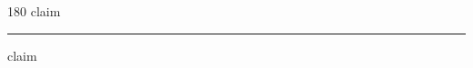 
\begin{frame}
\begin{center}
\begin{turn}{180}
{\fontsize{2.5cm}{1em}\selectfont claim}
\end{turn}
\vspace{1em}\par  
\hrule
\vspace{1em}\par  
{\fontsize{2.5cm}{1em}\selectfont claim}
\end{center}
\end{frame}
